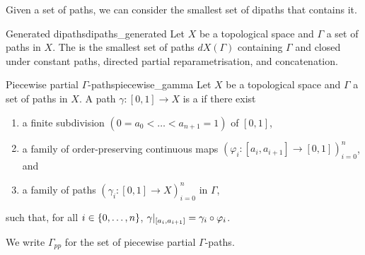 Given a set of paths, we can consider the smallest set of dipaths that contains it.

\begin{cdef}{Generated dipaths}{dipaths_generated}
	Let \( X \) be a topological space and \( \Gamma \) a set of paths in \( X \).
	The  is the smallest set of paths \( dX(\Gamma) \) containing \( \Gamma \) and closed under constant paths, directed partial reparametrisation, and concatenation.
\end{cdef}

\begin{cdef}{Piecewise partial \( \Gamma \)-paths}{piecewise_gamma}
	Let \( X \) be a topological space and \( \Gamma \) a set of paths in \( X \).
	A path \( \gamma\colon [0, 1] \to X \) is a  if there exist
	\begin{enumerate}
		\item a finite subdivision \( (0 = a_0 < \ldots < a_{n+1} = 1) \) of \( [0, 1] \),
		\item a family of order-preserving continuous maps \( (\varphi_i\colon [a_i, a_{i+1}] \to [0, 1])_{i=0}^n \), and
		\item a family of paths \( (\gamma_i\colon [0, 1] \to X)_{i=0}^n \) in \( \Gamma \),
	\end{enumerate}
	such that, for all \( i \in \{0, \dots, n\} \), \(\restr{\gamma}{[a_i, a_{i+1}]} = \gamma_i \circ \varphi_i\).

	We write \( \Gamma_\textit{pp} \) for the set of piecewise partial \( \Gamma \)-paths.
\end{cdef}

